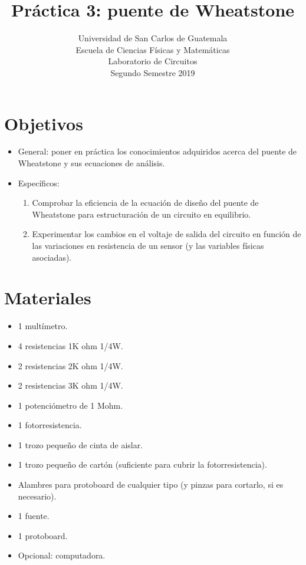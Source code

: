 \documentclass[letterpaper, 12 pt, conference]{ieeeconf}  %
\title{\LARGE \bf
Práctica 3: puente de Wheatstone
}
\author{Universidad de San Carlos de Guatemala \\%
Escuela de Ciencias Físicas y Matemáticas\\
Laboratorio de Circuitos\\
Segundo Semestre 2019
}
\begin{document}
\maketitle
\thispagestyle{empty}
\pagestyle{empty}

\section{Objetivos}
\begin{itemize}
    \item General: poner en práctica los conocimientos adquiridos acerca del puente de Wheatstone y sus ecuaciones de análisis.
    \item Específicos:
    \begin{enumerate}
    \item Comprobar la eficiencia de la ecuación de diseño del puente de Wheatstone para estructuración de un circuito en equilibrio.
    \item Experimentar los cambios en el voltaje de salida del circuito en función de las variaciones en resistencia de un sensor (y las variables físicas asociadas).
\end{enumerate}
\end{itemize}


\section{Materiales}
\begin{itemize}
    \item 1 multímetro.
    \item 4 resistencias 1K ohm 1/4W.
    \item 2 resistencias 2K ohm 1/4W.
    \item 2 resistencias 3K ohm 1/4W.
    \item 1 potenciómetro de 1 Mohm.
    \item 1 fotorresistencia.
    \item 1 trozo pequeño de cinta de aislar.
    \item 1 trozo pequeño de cartón (suficiente para cubrir la fotorresistencia).
    \item Alambres para protoboard de cualquier tipo (y pinzas para cortarlo, si es necesario).
    \item 1 fuente.
    \item 1 protoboard.
    \item Opcional: computadora.
\end{itemize}
\pagebreak
\end{document}
